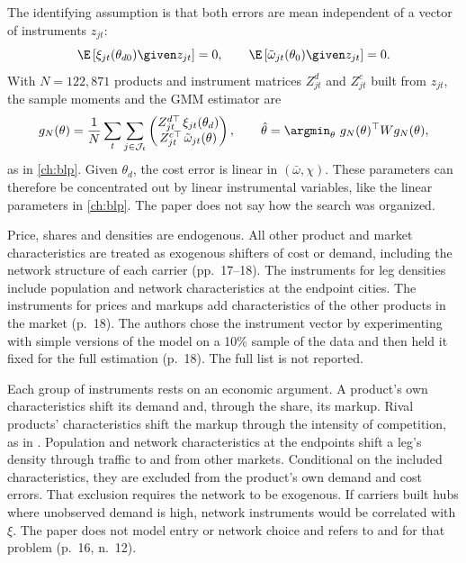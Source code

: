 The identifying assumption is that both errors are mean independent of a vector of instruments $z_{jt}$:
\begin{equation}\label{eq:09-bcs-moments}
\E\left[\xi_{jt}(\theta_{d0})\given z_{jt}\right]=0,\qquad \E\left[\tilde\omega_{jt}(\theta_0)\given z_{jt}\right]=0 .
\end{equation}
With $N=122{,}871$ products and instrument matrices $Z^d_{jt}$ and $Z^c_{jt}$ built from $z_{jt}$, the
sample moments and the GMM estimator are
\begin{equation}\label{eq:09-bcs-gmm}
g_N(\theta)=\frac{1}{N}\sum_t\sum_{j\in\mathcal{J}_t}
\begin{pmatrix}Z^{d\top}_{jt}\,\xi_{jt}(\theta_d)\\ Z^{c\top}_{jt}\,\tilde\omega_{jt}(\theta)\end{pmatrix},
\qquad
\hat\theta=\argmin_\theta\ g_N(\theta)^\top W g_N(\theta),
\end{equation}
as in \cref{ch:blp}. Given $\theta_d$, the cost error is linear in $(\bar\omega,\chi)$. These parameters can
therefore be concentrated out by linear instrumental variables, like the linear parameters in
\cref{ch:blp}. The paper does not say how the search was organized.

Price, shares and densities are endogenous. All other product and market characteristics are treated as
exogenous shifters of cost or demand, including the network structure of each carrier (pp.~17--18). The
instruments for leg densities include population and network characteristics at the endpoint cities. The
instruments for prices and markups add characteristics of the other products in the market (p.~18). The
authors chose the instrument vector by experimenting with simple versions of the model on a 10\% sample of
the data and then held it fixed for the full estimation (p.~18). The full list is not reported.

Each group of instruments rests on an economic argument. A product's own characteristics shift its demand
and, through the share, its markup. Rival products' characteristics shift the markup through the intensity
of competition, as in \citet{BerryLevinsohnPakes1995}. Population and network characteristics at the
endpoints shift a leg's density through traffic to and from other markets. Conditional on the included
characteristics, they are excluded from the product's own demand and cost errors. That exclusion requires
the network to be exogenous. If carriers built hubs where unobserved demand is high, network instruments
would be correlated with $\xi$. The paper does not model entry or network choice and refers to
\citet{Berry1990} and \citet{ReissSpiller1989} for that problem (p.~16, n.~12).

